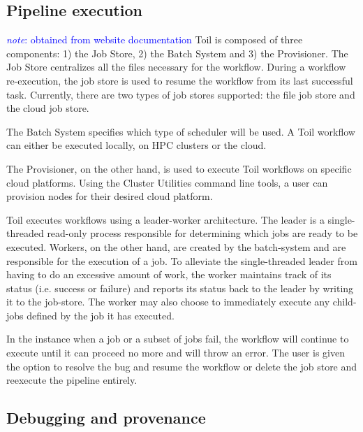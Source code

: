 \documentclass{report}
\newcommand{\note}[1]{\textcolor{blue}{\textit{note}: #1}}
\begin{document}
        \subsection{Pipeline execution} 
            \note{obtained from website documentation}
            Toil is composed of three components: 1) the Job Store, 2) the Batch
            System and 3) the Provisioner. The Job Store centralizes all the 
            files necessary for the workflow. During a workflow re-execution,
            the job store is used to resume the workflow from its last
            successful task. Currently, there are two types of job stores 
            supported: the file job store and the cloud job store.

            The Batch System specifies which type of scheduler will be used.
            A Toil workflow can either be executed locally, on HPC clusters or 
            the cloud.

            The Provisioner, on the other hand, is used to execute Toil
            workflows on specific cloud platforms. Using the Cluster Utilities
            command line tools, a user can provision nodes for their desired 
            cloud platform.

            Toil executes workflows using a leader-worker architecture. The
            leader is a single-threaded read-only process responsible for 
            determining which jobs are ready to be executed. Workers, on the 
            other hand, are created by the batch-system and are responsible
            for the execution of a job. To alleviate the single-threaded leader
            from having to do an excessive amount of work, the worker maintains
            track of its status (i.e. success or failure) and reports its status
            back to the leader by writing it to the job-store. The worker may
            also choose to immediately execute any child-jobs defined by the 
            job it has executed.

            In the instance when a job or a subset of jobs fail, the workflow
            will continue to execute until it can proceed no more and will throw
            an error. The user is given the option to resolve the bug and resume
            the workflow or delete the job store and reexecute the pipeline 
            entirely.
        \subsection{Debugging and provenance}
\end{document}
